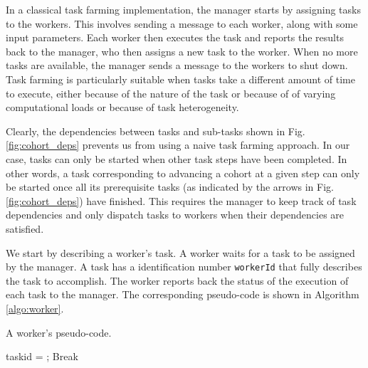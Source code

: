 \documentclass[a4paper,oneside,12pt]{article}
\begin{document}
In a classical task farming implementation, the manager starts by assigning tasks to the workers. This involves sending a message to each worker, along with 
some input parameters. Each worker then executes the task and reports the results back to the manager, who then assigns a new task to the worker. 
When no more tasks are available, the manager sends a message to the workers to shut down. Task farming is particularly suitable when tasks take a different amount of time to execute, either because of the nature of the task or because of
of varying computational loads or because of task heterogeneity.

Clearly, the dependencies between tasks and sub-tasks shown in Fig. \ref{fig:cohort_deps} prevents us from using a naive task farming approach. In our case, tasks can only be started when 
other task steps have been completed. In other words, a task corresponding to advancing a cohort at a given step can only be started once all its prerequisite tasks 
(as indicated by the arrows in Fig. \ref{fig:cohort_deps}) have finished. This requires the manager to keep track of task dependencies and only dispatch tasks to workers when 
their dependencies are satisfied.

We start by describing a worker's task. A worker waits for a task to be assigned by the manager. A task has a identification number \verb|workerId| that fully describes the task to accomplish.
The worker reports back the status of the execution of each task to the manager. The corresponding pseudo-code is shown in Algorithm \ref{algo:worker}.

\begin{algorithm}
\caption{A worker's pseudo-code.}
    \begin{algorithmic}[1] %

        taskid = ;
            Break
        \EndIf

        \State {}

        \State {}
    
    \EndWhile
\end{algorithmic}
\label{algo:worker}
\end{algorithm}
\end{document}
